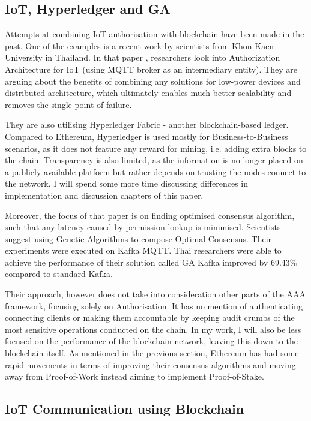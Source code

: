 \subsection{IoT, Hyperledger and GA}
Attempts at combining IoT authorisation with blockchain have been made in the past. One of the examples is a recent work by scientists from Khon Kaen University in Thailand. In that paper \cite{klaokliang2018novel}, researchers look into Authorization Architecture for IoT (using MQTT broker as an intermediary entity). They are arguing about the benefits of combining any solutions for low-power devices and distributed architecture, which ultimately enables much better scalability and removes the single point of failure.

They are also utilising Hyperledger Fabric - another blockchain-based ledger. Compared to Ethereum, Hyperledger \cite{cachin2016architecture} is used mostly for Business-to-Business scenarios, as it does not feature any reward for mining, i.e. adding extra blocks to the chain. Transparency is also limited, as the information is no longer placed on a publicly available platform but rather depends on trusting the nodes connect to the network. I will spend some more time discussing differences in implementation and discussion chapters of this paper.

Moreover, the focus of that paper is on finding optimised consensus algorithm, such that any latency caused by permission lookup is minimised. Scientists suggest using Genetic Algorithms to compose Optimal Consensus. Their experiments were executed on Kafka MQTT\cite{waehner_2019}. Thai researchers were able to achieve the performance of their solution called GA Kafka improved by 69.43\% compared to standard Kafka.

Their approach, however does not take into consideration other parts of the AAA framework, focusing solely on Authorisation. It has no mention of authenticating connecting clients or making them accountable by keeping audit crumbs of the most sensitive operations conducted on the chain. In my work, I will also be less focused on the performance of the blockchain network, leaving this down to the blockchain itself. As mentioned in the previous section, Ethereum has had some rapid movements in terms of improving their consensus algorithms and moving away from Proof-of-Work instead aiming to implement Proof-of-Stake.

\subsection{IoT Communication using Blockchain}

